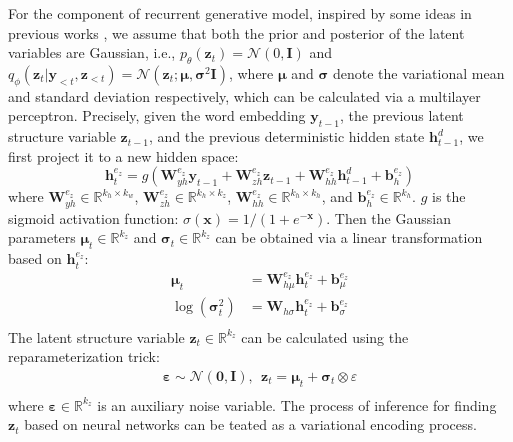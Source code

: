 \documentclass[11pt,letterpaper]{article}
\begin{document}
For the component of recurrent generative model, inspired by some ideas in previous works \cite{kingma2013auto,rezende2014stochastic,gregor2015draw}, we assume that both the prior and posterior of the latent variables are Gaussian, i.e.,  $p_\theta (\mathbf{z}_t) = \mathcal{N}(0, \mathbf{I})$ and $q_{\phi}(\mathbf{z}_t|\mathbf{y}_{<t}, \mathbf{z}_{<t}) = \mathcal{N}(\mathbf{z}_t; \boldsymbol{\mu}, \boldsymbol{\sigma}^2\mathbf{I})$, where  $\boldsymbol{\mu}$ and $\boldsymbol{\sigma}$ denote the variational mean and standard deviation respectively, which can be calculated via a multilayer perceptron. 
Precisely, given the word embedding $\mathbf{y}_{t-1}$, the previous latent structure variable $\mathbf{z}_{t-1}$, and the previous deterministic hidden state $\mathbf{h}_{t-1}^{d}$, we first project it to a new hidden space:
\[
{\mathbf{h}_{t}^{e_z}} = g({\mathbf{W}_{yh}^{e_z}}\mathbf{y}_{t-1} +
{\mathbf{W}_{zh}^{e_z}}\mathbf{z}_{t-1} + {\mathbf{W}_{hh}^{e_z}}\mathbf{h}^d_{t-1} + {\mathbf{b}^{e_z}_h})
\]
where $\mathbf{W}_{yh}^{e_z} \in \mathbb{R}^{k_h \times k_w}$, $\mathbf{W}_{zh}^{e_z} \in \mathbb{R}^{k_h \times k_z}$, $\mathbf{W}_{hh}^{e_z} \in \mathbb{R}^{k_h \times k_h}$, and $\mathbf{b}^{e_z}_h \in \mathbb{R}^{k_h}$. $g$ is the sigmoid activation function: $\sigma(\mathbf{x}) = 1 / (1 + e^{-\mathbf{x}})$.
Then the Gaussian parameters $\boldsymbol{\mu}_t \in \mathbb{R}^{k_z}$ and $\boldsymbol{\sigma}_t \in \mathbb{R}^{k_z}$ can be obtained via a linear transformation based on  $\mathbf{h}_t^{e_z}$:
\begin{equation}
\begin{aligned}
\boldsymbol{\mu}_t  &= {\mathbf{W}_{h\mu }^{e_z}}{\mathbf{h}_t^{e_z}} + {\mathbf{b}_{\mu }^{e_z}}\\
\log ({\boldsymbol{\sigma}_t ^2}) &= {\mathbf{W}_{h\sigma }}{\mathbf{h}_t^{e_z}} + {\mathbf{b}_{\sigma }^{e_z}}\\
\end{aligned}
\end{equation}
The latent structure variable $\mathbf{z}_t \in \mathbb{R}^{k_z}$ can be calculated using the reparameterization trick:
\begin{equation}
\label{e:ptrick}
\begin{array}{l}
\boldsymbol{\varepsilon}  \sim \mathcal{N}(\mathbf{0}, \mathbf{I}), \ \
\mathbf{z}_t = \boldsymbol{\mu}_t  + \boldsymbol{\sigma}_t  \otimes \varepsilon \\
\end{array}
\end{equation}
where $\boldsymbol{\varepsilon} \in \mathbb{R}^{k_z}$ is an auxiliary noise variable. The process of inference for finding $\mathbf{z}_t$ based on neural networks can be teated as a variational encoding process.
\end{document}
